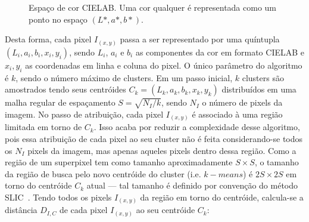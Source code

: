 \begin{figure}[ht!]
\begin{center}
  \caption{Espaço de cor CIELAB. Uma cor qualquer é representada como um ponto
    no espaço $(L*, a*, b*)$.}
  \label{fig:cielab}
  \end{center}
\end{figure}

Desta forma, cada pixel $I_{(x,y)}$ passa a ser representado por uma quíntupla
$(L_i, a_i, b_i, x_i, y_i)$, sendo $L_i$, $a_i$ e $b_i$ as componentes da cor em
formato CIELAB e $x_i, y_i$ as coordenadas em linha e coluna do pixel. O único
parâmetro do algoritmo é $k$, sendo o número máximo de clusters. Em um passo
inicial, $k$ clusters são amostrados tendo seus centróides $C_k = (L_k, a_k,
b_k, x_k, y_k)$ distribuídos em uma malha regular de espaçamento $S =
\sqrt{N_I/k}$, sendo $N_I$ o número de pixels da imagem. No passo de atribuição,
cada pixel $I_{(x,y)}$ é associado à uma região limitada em torno de $C_k$. Isso
acaba por reduzir a complexidade desse algoritmo, pois essa atribuição de
cada pixel ao seu cluster não é feita considerando-se todos os $N_I$ pixels da
imagem, mas apenas aqueles pixels dentro dessa região. Como a região de um
superpixel tem como tamanho aproximadamente $S \times S$, o tamanho da região de
busca pelo novo centróide do cluster (i.e. $k-means$) é $2S \times 2S$ em torno
do centróide $C_k$ atual --- tal tamanho é definido por convenção do método
SLIC~\cite{slic}. Tendo todos os pixels $I_{(x,y)}$ da região em torno do
centróide, calcula-se a distância $D_{I,C}$ de cada pixel $I_{(x,y)}$ ao seu
centróide $C_k$:

